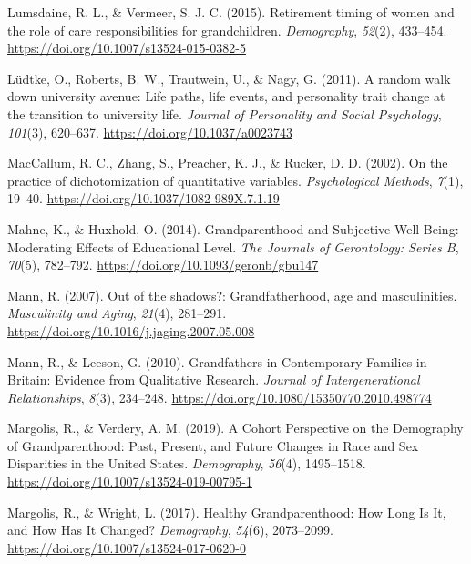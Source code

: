 \documentclass[
  english,
  man, noextraspace,floatsintext]{apa7}
\begin{document}
\leavevmode\hypertarget{ref-lumsdaineRetirementTimingWomen2015}{}%
Lumsdaine, R. L., \& Vermeer, S. J. C. (2015). Retirement timing of women and the role of care responsibilities for grandchildren. \emph{Demography}, \emph{52}(2), 433--454. \url{https://doi.org/10.1007/s13524-015-0382-5}

\leavevmode\hypertarget{ref-ludtkeRandomWalkUniversity2011}{}%
Lüdtke, O., Roberts, B. W., Trautwein, U., \& Nagy, G. (2011). A random walk down university avenue: Life paths, life events, and personality trait change at the transition to university life. \emph{Journal of Personality and Social Psychology}, \emph{101}(3), 620--637. \url{https://doi.org/10.1037/a0023743}

\leavevmode\hypertarget{ref-maccallumPracticeDichotomizationQuantitative2002}{}%
MacCallum, R. C., Zhang, S., Preacher, K. J., \& Rucker, D. D. (2002). On the practice of dichotomization of quantitative variables. \emph{Psychological Methods}, \emph{7}(1), 19--40. \url{https://doi.org/10.1037/1082-989X.7.1.19}

\leavevmode\hypertarget{ref-mahneGrandparenthoodSubjectiveWellBeing2014}{}%
Mahne, K., \& Huxhold, O. (2014). Grandparenthood and Subjective Well-Being: Moderating Effects of Educational Level. \emph{The Journals of Gerontology: Series B}, \emph{70}(5), 782--792. \url{https://doi.org/10.1093/geronb/gbu147}

\leavevmode\hypertarget{ref-mannOutShadowsGrandfatherhood2007}{}%
Mann, R. (2007). Out of the shadows?: Grandfatherhood, age and masculinities. \emph{Masculinity and Aging}, \emph{21}(4), 281--291. \url{https://doi.org/10.1016/j.jaging.2007.05.008}

\leavevmode\hypertarget{ref-mannGrandfathersContemporaryFamilies2010}{}%
Mann, R., \& Leeson, G. (2010). Grandfathers in Contemporary Families in Britain: Evidence from Qualitative Research. \emph{Journal of Intergenerational Relationships}, \emph{8}(3), 234--248. \url{https://doi.org/10.1080/15350770.2010.498774}

\leavevmode\hypertarget{ref-margolisCohortPerspectiveDemography2019}{}%
Margolis, R., \& Verdery, A. M. (2019). A Cohort Perspective on the Demography of Grandparenthood: Past, Present, and Future Changes in Race and Sex Disparities in the United States. \emph{Demography}, \emph{56}(4), 1495--1518. \url{https://doi.org/10.1007/s13524-019-00795-1}

\leavevmode\hypertarget{ref-margolisHealthyGrandparenthoodHow2017}{}%
Margolis, R., \& Wright, L. (2017). Healthy Grandparenthood: How Long Is It, and How Has It Changed? \emph{Demography}, \emph{54}(6), 2073--2099. \url{https://doi.org/10.1007/s13524-017-0620-0}
\end{document}
